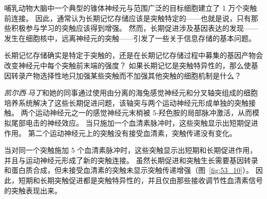 哺乳动物大脑中一个典型的锥体神经元与范围广泛的目标细胞建立了 1 万个突触前连接。
因此，通常认为长期记忆存储应该是突触特定的——也就是说，只有那些积极参与学习的突触应该得到增强。
然而，长期促进涉及基因表达的发现——发生在细胞核中，远离神经元的突触——引发了一些关于信息存储的基本问题。


长期记忆存储确实是特定于突触的，还是在长期记忆存储过程中募集的基因产物会改变神经元中每个突触前末端的强度？
如果长期记忆是突触特异性的，那么使基因转录产物选择性地只加强某些突触而不加强其他突触的细胞机制是什么？


\textit{凯尔西$\cdot$马丁}和她的同事通过使用由分离的海兔感觉神经元和分叉轴突组成的细胞培养系统解决了这些长期促进问题，该轴突与两个运动神经元形成单独的突触接触。
两个运动神经元之一的感觉神经元末梢被 5-羟色胺的局部脉冲激活，从而模拟尾部电击的神经效应。
当只施加一个血清素脉冲时，这些突触显示出短期促进作用。
第二个运动神经元上的突触没有接受血清素，突触传递没有变化。


当对同一个突触施加 5 个血清素脉冲时，这些突触显示出短期和长期促进作用，并且与运动神经元形成了新的突触连接。
虽然长期促进和突触生长需要基因转录和蛋白质合成，但未接受血清素的突触未显示突触传递增强（图~\ref{fig:53_10}）。
因此，短期和长期突触促进都是突触特异性的，并且仅由那些接收调节性血清素信号的突触表现出来。


